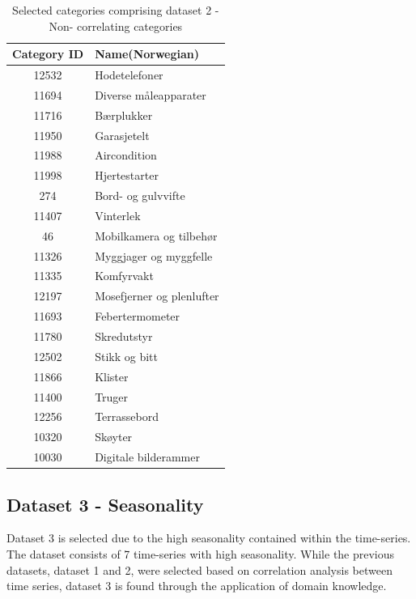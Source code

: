 \begin{table}[H]
  \centering
  \caption{Selected categories comprising dataset 2 - Non- correlating categories}
  \label{table:dataset2}
  \begin{tabular}{|c|l|}\hline
    Category ID & Name(Norwegian)  \\ \hline
    12532       & Hodetelefoner    \\ \hline
    11694       & Diverse måleapparater    \\ \hline
    11716       & Bærplukker     \\ \hline
    11950       & Garasjetelt    \\ \hline
    11988       & Aircondition   \\ \hline
    11998       & Hjertestarter   \\ \hline
    274         & Bord- og gulvvifte    \\ \hline
    11407       & Vinterlek     \\ \hline
    46          & Mobilkamera og tilbehør     \\ \hline
    11326       & Myggjager og myggfelle   \\ \hline
    11335       & Komfyrvakt   \\ \hline
    12197       & Mosefjerner og plenlufter       \\ \hline
    11693       & Febertermometer      \\ \hline
    11780       & Skredutstyr      \\ \hline
    12502       & Stikk og bitt     \\ \hline
    11866       & Klister     \\ \hline
    11400       & Truger    \\ \hline
    12256       & Terrassebord     \\ \hline
    10320       & Skøyter     \\ \hline
    10030       & Digitale bilderammer     \\ \hline
  \end{tabular}
\end{table}




\subsection{Dataset 3 - Seasonality}

Dataset 3 is selected due to the high seasonality contained within the time-series.
The dataset consists of 7 time-series with high seasonality.
While the previous datasets, dataset 1 and 2, were selected based on correlation analysis between time series,
dataset 3 is found through the application of domain knowledge.

